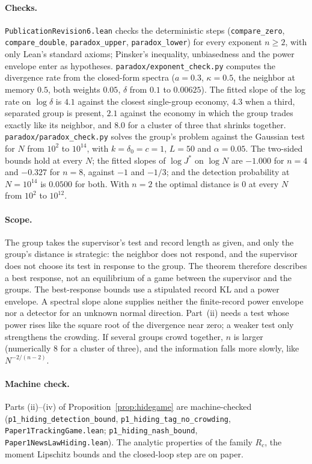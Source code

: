 \documentclass[12pt]{article}
\theoremstyle{definition}
\theoremstyle{remark}
\begin{document}
\paragraph{Checks.} \nolinkurl{PublicationRevision6.lean} checks the deterministic steps (\nolinkurl{compare_zero}, \nolinkurl{compare_double}, \nolinkurl{paradox_upper}, \nolinkurl{paradox_lower}) for every exponent $n\ge2$, with only Lean's standard axioms; Pinsker's inequality, unbiasedness and the power envelope enter as hypotheses. \nolinkurl{paradox/exponent_check.py} computes the divergence rate from the closed-form spectra ($a=0.3$, $\kappa=0.5$, the neighbor at memory $0.5$, both weights $0.05$, $\delta$ from $0.1$ to $0.00625$). The fitted slope of the log rate on $\log\delta$ is $4.1$ against the closest single-group economy, $4.3$ when a third, separated group is present, $2.1$ against the economy in which the group trades exactly like its neighbor, and $8.0$ for a cluster of three that shrinks together. \nolinkurl{paradox/paradox_check.py} solves the group's problem against the Gaussian test for $N$ from $10^2$ to $10^{14}$, with $k=\delta_0=c=1$, $L=50$ and $\alpha=0.05$. The two-sided bounds hold at every $N$; the fitted slopes of $\log J^*$ on $\log N$ are $-1.000$ for $n=4$ and $-0.327$ for $n=8$, against $-1$ and $-1/3$; and the detection probability at $N=10^{14}$ is $0.0500$ for both. With $n=2$ the optimal distance is $0$ at every $N$ from $10^2$ to $10^{12}$.

\paragraph{Scope.} The group takes the supervisor's test and record length as given, and only the group's distance is strategic: the neighbor does not respond, and the supervisor does not choose its test in response to the group. The theorem therefore describes a best response, not an equilibrium of a game between the supervisor and the groups. The best-response bounds use a stipulated record KL and a power envelope. A spectral slope alone supplies neither the finite-record power envelope nor a detector for an unknown normal direction. Part~(ii) needs a test whose power rises like the square root of the divergence near zero; a weaker test only strengthens the crowding. If several groups crowd together, $n$ is larger (numerically $8$ for a cluster of three), and the information falls more slowly, like $N^{-2/(n-2)}$.

\paragraph{Machine check.} Parts (ii)--(iv) of Proposition~\ref{prop:hidegame} are machine-checked (\texttt{p1\_hiding\_detection\_bound}, \texttt{p1\_hiding\_tag\_no\_crowding}, \nolinkurl{Paper1TrackingGame.lean}; \texttt{p1\_hiding\_nash\_bound}, \nolinkurl{Paper1NewsLawHiding.lean}). The analytic properties of the family $R_c$, the moment Lipschitz bounds and the closed-loop step are on paper.
\end{document}
